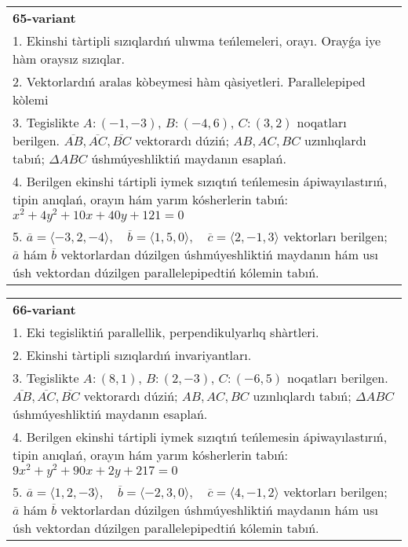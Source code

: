\documentclass{article}
\begin{document}
\begin{tabular}{m{17cm}}
\textbf{65-variant}\\
1. Ekinshi tàrtipli sızıqlardıń ulıwma teńlemeleri, orayı. Orayǵa iye hàm oraysız sızıqlar.\\

2. Vektorlardıń aralas kòbeymesi hàm qàsiyetleri. Parallelepiped kòlemi\\

3. Tegislikte $A: (-1, -3)$, $B: (-4, 6)$, $C: (3, 2)$ noqatları berilgen. $\overline{AB}, \overline{AC}, \overline{BC}$ vektorardı dúziń; $AB, AC, BC$ uzınlıqlardı tabıń; $\Delta ABC$ úshmúyeshliktiń maydanın esaplań. \\

4. Berilgen ekinshi tártipli iymek sızıqtıń teńlemesin ápiwayılastırıń, tipin anıqlań, orayın hám yarım kósherlerin tabıń: $x^2+4y^2+10x+40y+121=0$\\

5. \(\overline{a} = \langle -3, 2, -4 \rangle, \quad \overline{b} = \langle 1, 5, 0 \rangle, \quad \overline{c} = \langle 2, -1, 3 \rangle\) vektorları berilgen; \(\overline{a}\) hám \(\overline{b}\) vektorlardan dúzilgen úshmúyeshliktiń maydanın hám usı úsh vektordan dúzilgen parallelepipedtiń kólemin tabıń.
\end{tabular}
\vspace{1cm}


\begin{tabular}{m{17cm}}
\textbf{66-variant}\\
1. Eki tegisliktiń parallellik, perpendikulyarlıq shàrtleri.\\

2. Ekinshi tàrtipli sızıqlardıń invariyantları.\\

3. Tegislikte $A: (8, 1)$, $B: (2, -3)$, $C: (-6, 5)$ noqatları berilgen. $\overline{AB}, \overline{AC}, \overline{BC}$ vektorardı dúziń; $AB, AC, BC$ uzınlıqlardı tabıń; $\Delta ABC$ úshmúyeshliktiń maydanın esaplań. \\

4. Berilgen ekinshi tártipli iymek sızıqtıń teńlemesin ápiwayılastırıń, tipin anıqlań, orayın hám yarım kósherlerin tabıń: $9x^2+y^2+90x+2y+217=0$\\

5. \(\overline{a} = \langle 1, 2, -3 \rangle, \quad \overline{b} = \langle -2, 3, 0 \rangle, \quad \overline{c} = \langle 4, -1, 2 \rangle\) vektorları berilgen; \(\overline{a}\) hám \(\overline{b}\) vektorlardan dúzilgen úshmúyeshliktiń maydanın hám usı úsh vektordan dúzilgen parallelepipedtiń kólemin tabıń.
\end{tabular}
\vspace{1cm}
\end{document}
